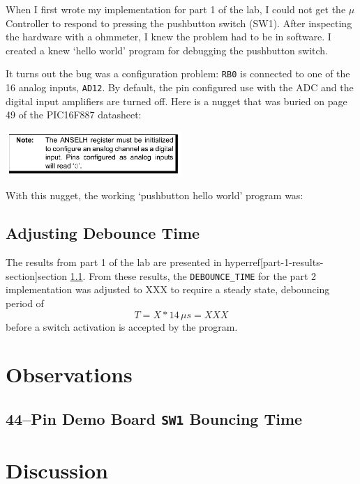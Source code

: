 \documentclass[11pt]{article}
\begin{document}
When I first wrote my implementation for part 1 of the lab,
I could not get the $\mu$Controller to respond to pressing the
pushbutton switch (SW1). After inspecting the hardware with a ohmmeter,
I knew the problem had to be in software. I created a knew `hello world'
program for debugging the pushbutton switch.

It turns out the bug was a configuration problem: \texttt{RB0} is connected
to one of the 16 analog inputs, \texttt{AD12}. By default, the pin configured
use with the ADC and the digital input amplifiers are turned off.
Here is a nugget that was buried on page 49 of the PIC16F887 datasheet:
\begin{center}
	\includegraphics[width=0.5\textwidth]{Figures/port-b-configuration-note.pdf}
\end{center}
With this nugget, the working `pushbutton hello world' program was:


\subsection{Adjusting Debounce Time}

The results from part 1 of the lab are presented in
hyperref[part-1-results-section]{section \ref{part-1-results-section}}.
From these results, the \texttt{DEBOUNCE\_TIME} for the part 2 implementation
was adjusted to XXX to require a steady state, debouncing period of
\begin{equation*}
T=X*14\, \mu s=XXX
\end{equation*}
before a switch activation is accepted by the program.

\section{Observations}

\subsection{44--Pin Demo Board \texttt{SW1} Bouncing Time}
\label{part-1-results-section}

\section{Discussion}
\end{document}
